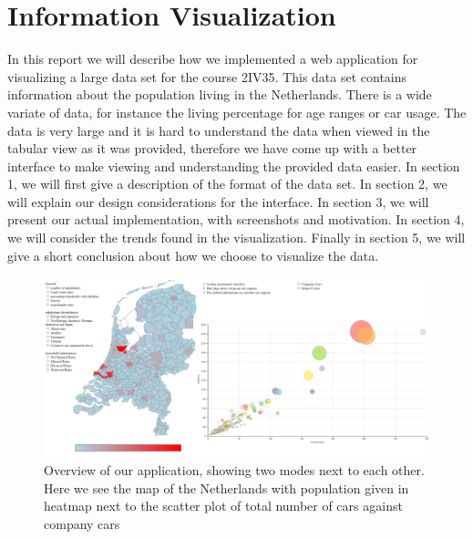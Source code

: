 \documentclass[a4paper,twoside,11pt]{article}
\begin{document}
\section*{Information Visualization}
In this report we will describe how we implemented a web application for visualizing a large data set for the course 2IV35. This data set contains information about the population living in the Netherlands.  \newline
There is a wide variate of data, for instance the living percentage for age ranges or car usage. The data is very large and it is hard to understand the data when viewed in the tabular view as it was provided, therefore we have come up with a better interface to make viewing and understanding the provided data easier. \newline
In section 1, we will first give a description of the format of the data set. \newline
In section 2, we will explain our design considerations for the interface. \newline
In section 3, we will present our actual implementation, with screenshots and motivation. \newline
In section 4, we will consider the trends found in the visualization. \newline
Finally in section 5, we will give a short conclusion about how we choose to visualize the data. \newline
\newline
\newline
\newline
\newline
\newline
\begin{figure}[h]
  \begin{center}
    \includegraphics[width=1\textwidth]{FullScreen2}
  \end{center}
  \caption{Overview of our application, showing two modes next to each other. Here we see the map of the Netherlands with population given in heatmap next to the scatter plot of total number of cars against company cars}
\end{figure}
\end{document}
